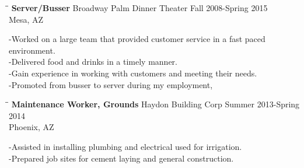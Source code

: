 \documentclass{res}
\begin{document}
\begin{resume}
    \begin{tabbing}
    	\hspace{2.3in}\= \hspace{2.6in}\= \kill %
    	{\bf Server/Busser} \>Broadway Palm Dinner Theater     
    	\>Fall 2008-Spring 2015
    	\\
    	\>Mesa, AZ
    \end{tabbing}\vspace{-20pt}      %
    -Worked on a large team that provided customer service in a fast paced environment.
    \\-Delivered food and drinks in a timely manner.
    \\-Gain experience in working with customers and meeting their needs.
    \\-Promoted from busser to server during my employment, 
    
    \begin{tabbing}
    	\hspace{2.3in}\= \hspace{2.6in}\= \kill %
    	{\bf Maintenance Worker, Grounds} \>Haydon Building Corp     \>Summer 2013-Spring 2014\\
    	\>Phoenix, AZ
    \end{tabbing}\vspace{-20pt}      %
    -Assisted in installing plumbing and electrical used for irrigation.
    \\-Prepared job sites for cement laying and general construction.    
  
 
\end{resume}
\end{document}
